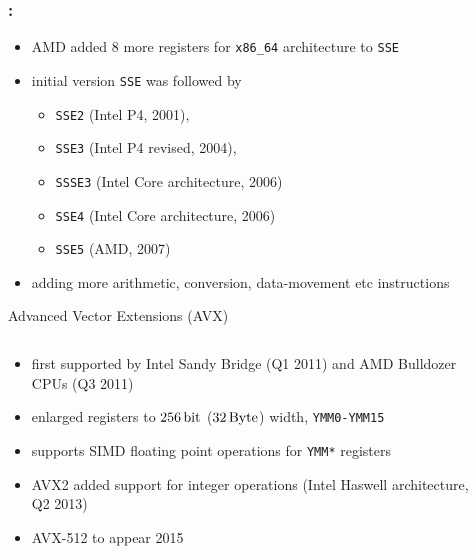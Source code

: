 \documentclass[9pt,xcolor=table]{beamer}
\begin{document}
\begin{frame}
\frametitle{\insertsectionhead{}: \insertsubsectionhead{}}
\begin{itemize}
\item AMD added 8 more registers for \texttt{x86\_64} architecture to \texttt{SSE}
\item initial version \texttt{SSE} was followed by 
  \begin{itemize}
  \item \texttt{SSE2} (Intel P4, 2001),
  \item \texttt{SSE3} (Intel P4 revised, 2004),
  \item \texttt{SSSE3} (Intel Core architecture, 2006)
  \item \texttt{SSE4} (Intel Core architecture, 2006)
  \item \texttt{SSE5} (AMD, 2007)
  \end{itemize}
\item adding more arithmetic, conversion, data-movement etc instructions
\end{itemize}
\vfill\pause
\begin{block}{Advanced Vector Extensions (AVX)}
  \begin{columns}[c]
  \begin{column}{.68\textwidth}
      \begin{itemize}
      \item first supported by Intel Sandy Bridge (Q1 2011) and AMD Bulldozer CPUs (Q3 2011)
      \item enlarged registers to $\unit[256]{bit}$ ($\unit[32]{Byte}$) width, \texttt{YMM0-YMM15}
      \item supports SIMD floating point operations for \texttt{YMM*} registers 
      \item AVX2 added support for integer operations (Intel Haswell architecture, Q2 2013)
      \item AVX-512 to appear 2015
      \end{itemize}
  \end{column}
  \begin{column}{.27\textwidth}
    \vfill

\end{column}
\end{columns}
\end{block}
\end{frame}
\end{document}
